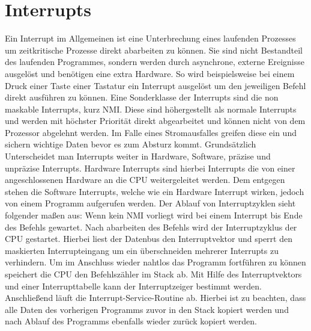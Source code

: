 \section{Interrupts}
Ein Interrupt im Allgemeinen ist eine Unterbrechung eines laufenden Prozesses um zeitkritische Prozesse direkt abarbeiten zu können. Sie sind nicht Bestandteil des laufenden Programmes, sondern werden durch asynchrone, externe Ereignisse ausgelöst und benötigen eine extra Hardware. So wird beispielsweise bei einem Druck einer Taste einer Tastatur ein Interrupt ausgelöst um den jeweiligen Befehl direkt ausführen zu können. Eine Sonderklasse der Interrupts sind die non maskable Interrupts, kurz NMI. Diese sind höhergestellt als normale Interrupts und werden mit höchster Priorität direkt abgearbeitet und können nicht von dem Prozessor abgelehnt werden. Im Falle eines Stromausfalles greifen diese ein und sichern wichtige Daten bevor es zum Absturz kommt. Grundsätzlich Unterscheidet man Interrupts weiter in Hardware, Software, präzise und unpräzise Interrupts. Hardware Interrupts sind hierbei Interrupts die von einer angeschlossenen Hardware an die CPU weitergeleitet werden. Dem entgegen stehen die Software Interrupts, welche wie ein Hardware Interrupt wirken, jedoch von einem Programm aufgerufen werden. Der Ablauf von Interruptzyklen sieht folgender maßen aus: Wenn kein NMI vorliegt wird bei einem Interrupt bis Ende des Befehls gewartet. Nach abarbeiten des Befehls wird der Interruptzyklus der CPU gestartet. Hierbei liest der Datenbus den Interruptvektor und sperrt den maskierten Interrupteingang um ein überschneiden mehrerer Interrupts zu verhindern. Um im Anschluss wieder nahtlos das Programm fortführen zu können speichert die CPU den Befehlszähler im Stack ab. Mit Hilfe des Interruptvektors und einer Interrupttabelle kann der Interruptzeiger bestimmt werden. Anschließend läuft die Interrupt-Service-Routine ab. Hierbei ist zu beachten, dass alle Daten des vorherigen Programms zuvor in den Stack kopiert werden und nach Ablauf des Programms ebenfalls wieder zurück kopiert werden.